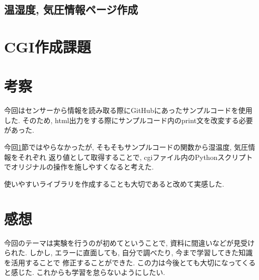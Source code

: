 \documentclass[titlepage]{jsarticle}
\begin{document}
    \subsection{温湿度, 気圧情報ページ作成}

\section{CGI作成課題} \label{kadai}


\section{考察}
    今回はセンサーから情報を読み取る際にGitHubにあったサンプルコードを使用した.
    そのため, html出力をする際にサンプルコード内のprint文を改変する必要があった.

    今回\ref{kadai}節ではやらなかったが, そもそもサンプルコードの関数から湿温度, 気圧情報をそれぞれ
    返り値として取得することで, cgiファイル内のPythonスクリプトでオリジナルの操作を施しやすくなると考えた.

    使いやすいライブラリを作成することも大切であると改めて実感した.

\section{感想}
    今回のテーマは実験を行うのが初めてということで, 資料に間違いなどが見受けられた.
    しかし, エラーに直面しても, 自分で調べたり, 今まで学習してきた知識を活用することで
    修正することができた. この力は今後とても大切になってくると感じた.
    これからも学習を怠らないようにしたい.
\end{document}

